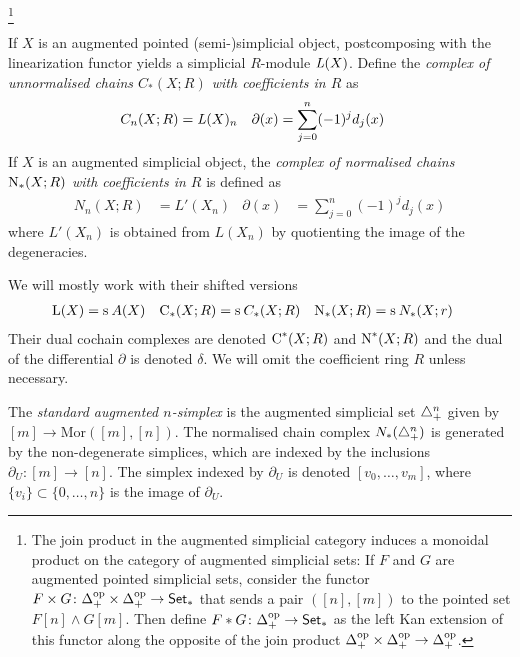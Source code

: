 \footnote{The join product in the augmented simplicial category induces a monoidal product on the category of augmented simplicial sets: If $F$ and $G$ are augmented pointed simplicial sets, consider the functor $F\times G\colon \Delta_+^{\mathrm{op}}\times \Delta_+^{\mathrm{op}}\to \mathsf{Set}_*$ that sends a pair $([n],[m])$ to the pointed set $F[n]\wedge G[m]$. Then define $F*G\colon \Delta_+^{\mathrm{op}}\to \mathsf{Set}_*$ as the left Kan extension of this functor along the opposite of the join product $\Delta_+^{\mathrm{op}}\times \Delta_+^{\mathrm{op}}\to \Delta_+^{\mathrm{op}}$.}

If $X$ is an augmented pointed (semi-)simplicial object, postcomposing with the linearization functor yields a simplicial $R$-module $\operatorname{{\it L}}(X)$. Define the \emph{complex of unnormalised chains $C_*(X;R)$ with coefficients in $R$} as
\begin{align*}
	C_n(X;R) &= \operatorname{{\it L}}(X)_n
	&
	\partial(x) &= \sum_{j=0}^{n} (-1)^jd_j(x)
\end{align*}
If $X$ is an augmented simplicial object, the \emph{complex of normalised chains $\operatorname{N}_*(X;R)$ with coefficients in $R$} is defined as
\begin{align*}
	N_n(X;R) &= L'(X_n)
	&
	\partial(x) &= \sum_{j=0}^{n} (-1)^jd_j(x)
\end{align*}
where $L'(X_n)$ is obtained from $L(X_n)$ by quotienting the image of the degeneracies.


We will mostly work with their shifted versions
\begin{align*}
	\operatorname{L}(X) &= \operatorname{s}^{}A(X)  & \operatorname{C}_*(X;R) &= \operatorname{s}^{} C_*(X;R) & \operatorname{N}_*(X;R) &= \operatorname{s}^{} N_*(X;r)
\end{align*}
Their dual cochain complexes are denoted $\operatorname{C}^*(X;R)$ and $\operatorname{N}^*(X;R)$ and the dual of the differential $\partial$ is denoted $\delta$. We will omit the coefficient ring $R$ unless necessary.


The \emph{standard augmented $n$-simplex} is the augmented simplicial set $\triangle^n_+$ given by $[m]\to \mathrm{Mor}([m],[n])$. The normalised chain complex $N_*(\triangle_{+}^n)$ is generated by the non-degenerate simplices, which are indexed by the inclusions $\partial_U\colon [m]\to [n]$. The simplex indexed by $\partial_U$ is denoted $[v_0,\ldots,v_{m}]$, where $\{v_i\}\subset \{0,\ldots,n\}$ is the image of $\partial_U$.

